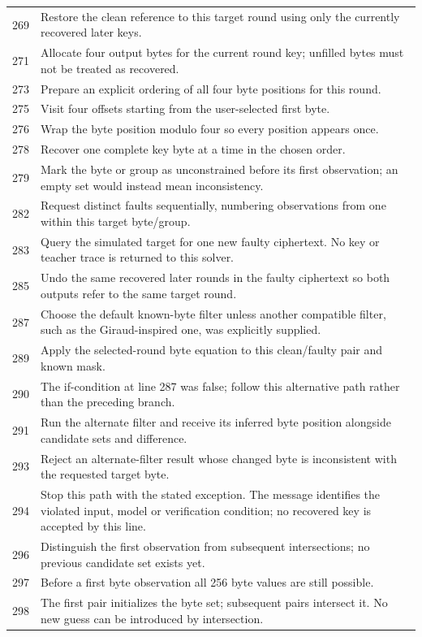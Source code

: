 \begin{longtable}{r >{\raggedright\arraybackslash}p{138mm}}
269&Restore the clean reference to this target round using only the currently recovered later keys.\\
271&Allocate four output bytes for the current round key; unfilled bytes must not be treated as recovered.\\
273&Prepare an explicit ordering of all four byte positions for this round.\\
275&Visit four offsets starting from the user-selected first byte.\\
276&Wrap the byte position modulo four so every position appears once.\\
278&Recover one complete key byte at a time in the chosen order.\\
279&Mark the byte or group as unconstrained before its first observation; an empty set would instead mean inconsistency.\\
282&Request distinct faults sequentially, numbering observations from one within this target byte/group.\\
283&Query the simulated target for one new faulty ciphertext. No key or teacher trace is returned to this solver.\\
285&Undo the same recovered later rounds in the faulty ciphertext so both outputs refer to the same target round.\\
287&Choose the default known-byte filter unless another compatible filter, such as the Giraud-inspired one, was explicitly supplied.\\
289&Apply the selected-round byte equation to this clean/faulty pair and known mask.\\
290&The if-condition at line 287 was false; follow this alternative path rather than the preceding branch.\\
291&Run the alternate filter and receive its inferred byte position alongside candidate sets and difference.\\
293&Reject an alternate-filter result whose changed byte is inconsistent with the requested target byte.\\
294&Stop this path with the stated exception. The message identifies the violated input, model or verification condition; no recovered key is accepted by this line.\\
296&Distinguish the first observation from subsequent intersections; no previous candidate set exists yet.\\
297&Before a first byte observation all 256 byte values are still possible.\\
298&The first pair initializes the byte set; subsequent pairs intersect it. No new guess can be introduced by intersection.\\

\end{longtable}
